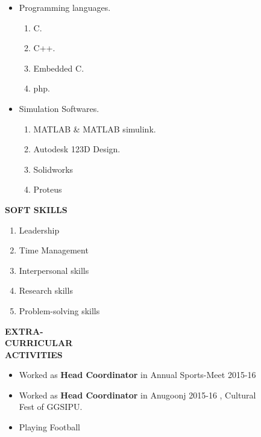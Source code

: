 \documentclass[11pt]{article}
\begin{document}
\begin{itemize}
\vspace{-0.60in}	                                     		\addtolength{\itemindent}{1.2in}	                                     \item Programming languages.
{\begin{enumerate}
\addtolength{\itemindent}{1.359in}                             		\item C.
\item C++.
\item Embedded C.
\item php.
\end{enumerate}
}
\item  Simulation Softwares.
{\begin{enumerate}
\addtolength{\itemindent}{1.359in}                             		\item MATLAB \& MATLAB simulink.
\item Autodesk 123D Design.
\item Solidworks 
\item Proteus
\end{enumerate}
}
\end{itemize}

\begin{flushleft}
{\Large \textbf{SOFT SKILLS}}
\begin{flushright} 
\begin{enumerate}
\addtolength{\itemindent}{1.55in} 
\vspace{-0.32in} 
\item Leadership
\item Time Management	
\item Interpersonal skills
\item Research skills 
\item Problem-solving skills
\end{enumerate} 
\end{flushright}
\end{flushleft}	

\begin{flushleft}

{\large \bf{EXTRA-\\ CURRICULAR\\ ACTIVITIES}}
\begin{itemize}
\addtolength{\itemindent}{1.5in}
\vspace{-0.70in} 
\item Worked as {\bf Head Coordinator} in Annual Sports-Meet 2015-16 
\item Worked as {\bf Head Coordinator} in Anugoonj 2015-16 , Cultural\\ \hspace{1.65in} Fest of GGSIPU.
\item Playing Football
\end{itemize}
\end{flushleft}                                    		
\end{document}
